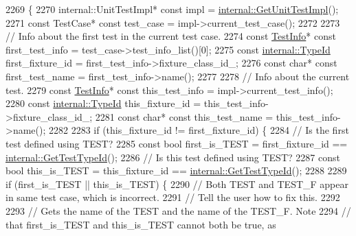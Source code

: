 \begin{DoxyCode}
2269                                \{
2270   internal::UnitTestImpl* \textcolor{keyword}{const} impl = \hyperlink{namespacetesting_1_1internal_a9bd0caf5d16512de38b39599c13ee634}{internal::GetUnitTestImpl}();
2271   \textcolor{keyword}{const} TestCase* \textcolor{keyword}{const} test\_case = impl->current\_test\_case();
2272 
2273   \textcolor{comment}{// Info about the first test in the current test case.}
2274   \textcolor{keyword}{const} \hyperlink{classtesting_1_1Test_a4c49c2cdb6c328e6b709b4542f23de3c}{TestInfo}* \textcolor{keyword}{const} first\_test\_info = test\_case->test\_info\_list()[0];
2275   \textcolor{keyword}{const} \hyperlink{namespacetesting_1_1internal_ab1114197d3c657d8b7f8e0c5caa12d00}{internal::TypeId} first\_fixture\_id = first\_test\_info->fixture\_class\_id\_;
2276   \textcolor{keyword}{const} \textcolor{keywordtype}{char}* \textcolor{keyword}{const} first\_test\_name = first\_test\_info->name();
2277 
2278   \textcolor{comment}{// Info about the current test.}
2279   \textcolor{keyword}{const} \hyperlink{classtesting_1_1Test_a4c49c2cdb6c328e6b709b4542f23de3c}{TestInfo}* \textcolor{keyword}{const} this\_test\_info = impl->current\_test\_info();
2280   \textcolor{keyword}{const} \hyperlink{namespacetesting_1_1internal_ab1114197d3c657d8b7f8e0c5caa12d00}{internal::TypeId} this\_fixture\_id = this\_test\_info->fixture\_class\_id\_;
2281   \textcolor{keyword}{const} \textcolor{keywordtype}{char}* \textcolor{keyword}{const} this\_test\_name = this\_test\_info->name();
2282 
2283   \textcolor{keywordflow}{if} (this\_fixture\_id != first\_fixture\_id) \{
2284     \textcolor{comment}{// Is the first test defined using TEST?}
2285     \textcolor{keyword}{const} \textcolor{keywordtype}{bool} first\_is\_TEST = first\_fixture\_id == \hyperlink{namespacetesting_1_1internal_ad0d66d56ead224263cd100c1d6bfc562}{internal::GetTestTypeId}();
2286     \textcolor{comment}{// Is this test defined using TEST?}
2287     \textcolor{keyword}{const} \textcolor{keywordtype}{bool} this\_is\_TEST = this\_fixture\_id == \hyperlink{namespacetesting_1_1internal_ad0d66d56ead224263cd100c1d6bfc562}{internal::GetTestTypeId}();
2288 
2289     \textcolor{keywordflow}{if} (first\_is\_TEST || this\_is\_TEST) \{
2290       \textcolor{comment}{// Both TEST and TEST\_F appear in same test case, which is incorrect.}
2291       \textcolor{comment}{// Tell the user how to fix this.}
2292 
2293       \textcolor{comment}{// Gets the name of the TEST and the name of the TEST\_F.  Note}
2294       \textcolor{comment}{// that first\_is\_TEST and this\_is\_TEST cannot both be true, as}

\end{DoxyCode}
